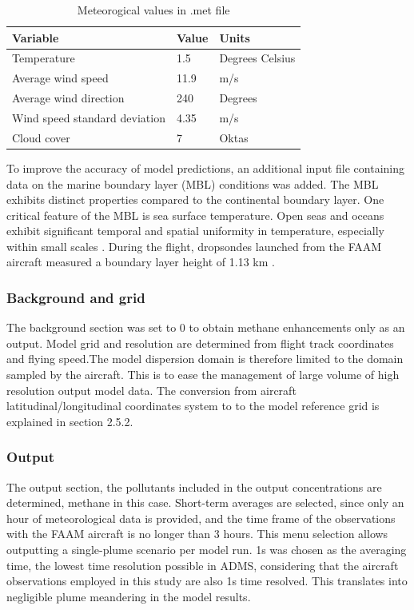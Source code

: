 \documentclass[12pt]{article}
\begin{document}
\begin{table}[H]
\centering
\caption{Meteorogical values in .met file}
\label{tab:my-table}
\begin{tabular}{@{}lll@{}}
\toprule

Variable                & Value & Units           \\  \midrule
Temperature& 1.5   & Degrees Celsius \\
Average wind speed              & 11.9  & m/s             \\
Average wind direction          & 240   & Degrees         \\
Wind speed standard deviation & 4.35  & m/s             \\
Cloud cover             & 7     & Oktas           \\
\bottomrule
\end{tabular}
\end{table}

To improve the accuracy of model predictions, an additional input file containing data on the marine boundary layer (MBL) conditions was added. The MBL exhibits distinct properties compared to the continental  boundary layer.  One critical feature of the MBL is sea surface temperature.  Open seas and oceans exhibit significant temporal and spatial uniformity in temperature, especially within small scales \parencite[]{1988ChapterLayer}. During the flight, dropsondes launched from the FAAM aircraft measured a boundary layer height of 1.13 km \parencite[]{Lee2018FlowRelease}.

\subsubsection{Background and grid}

The background section was set to 0 to obtain methane enhancements only as an output. Model grid and resolution are determined from flight track coordinates and flying speed.The model dispersion domain is therefore limited to the domain sampled by the aircraft. This is to ease the management of large volume of high resolution output model data. The conversion from aircraft latitudinal/longitudinal coordinates system to to the model reference grid is explained in section 2.5.2. 
\subsubsection{Output}

The output section, the pollutants included in the output concentrations are determined, methane in this case. Short-term averages are selected, since only an hour of meteorological data is provided, and the time frame of the observations with the FAAM aircraft is no longer than 3  hours. This menu selection allows outputting a single-plume scenario per model run. 1s was chosen as the averaging time, the lowest time resolution possible in ADMS, considering that the aircraft observations employed in this study are also 1s time resolved. This translates into negligible plume meandering in the model results. 
\end{document}
